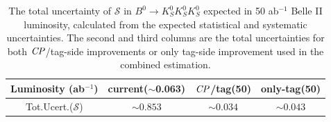 \begin{table}[htpb]
	\centering
	\caption{The total uncertainty of $\mathcal{S}$ in $B^0 \to K_S^0  K_S^0  K_S^0$ expected in 50 ab$^{-1}$ Belle II luminosity, calculated from the expected statistical and systematic uncertainties. The second and third columns are the total uncertainties for both $\it{CP}$/tag-side improvements or only tag-side improvement used in the combined estimation.}
	\label{tab:err_full}
	\begin{tabular}{c|c|c |c}
		\hline
		Luminosity (ab$^{-1}$) & current($\sim$0.063)&$\it{CP}$/tag(50) & only-tag(50)\\
		\hline
		Tot.Ucert.($\mathcal{S}$) & $\sim0.853$ & $\sim0.034$ & $\sim0.043$ \\
		\hline
	\end{tabular}
\end{table}

